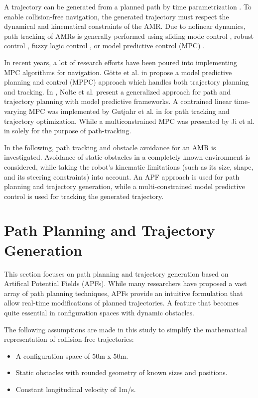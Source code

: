 \documentclass[a4paper, twocolumn]{article}
\begin{document}
A trajectory can be generated from a planned path by time parametrization \cite{roesmann1}. 
To enable collision-free navigation, the generated trajectory must respect the dynamical and kinematical constraints of the AMR.
Due to nolinear dynamics, path tracking of AMRs is generally performed using sliding mode control \cite{yang1}, 
robust control \cite{normey-rico1}, fuzzy logic control \cite{antonelli1}, or model predictive control (MPC) \cite{ji1}.

In recent years, a lot of research efforts have been poured into implementing MPC algorithms for navigation.
Götte et al. in \cite{goette1} propose a model predictive planning and control (MPPC) approach which handles both trajectory planning and tracking.
In \cite{nolte1}, Nolte et al. present a generalized approach for path and trajectory planning with model predictive frameworks.
A contrained linear time-varying MPC was implemented by Gutjahr et al. in \cite{gutjahr1} for path tracking and trajectory optimization.
While a multiconstrained MPC was presented by Ji et al. in \cite{ji1} solely for the purpose of path-tracking.

In the following, path tracking and obstacle avoidance for an AMR is investigated.
Avoidance of static obstacles in a completely known environment is considered, while taking the robot’s kinematic limitations 
(such as its size, shape, and its steering constraints) into account.
An APF approach is used for path planning and trajectory generation, 
while a multi-constrained model predictive control is used for tracking the generated trajectory.


\section{Path Planning and Trajectory Generation}
This section focuses on path planning and trajectory generation based on Artifical Potential Fields (APFs).
While many researchers have proposed a vast array of path planning techniques, APFs provide an intuitive formulation that 
allow real-time modifications of planned trajectories. A feature that becomes quite essential in configuration spaces with dynamic obstacles.

The following assumptions are made in this study to simplify the mathematical representation of collision-free trajectories:
\begin{itemize}
    \item A configuration space of 50m x 50m.
    \item Static obstacles with rounded geometry of known sizes and positions.
    \item Constant longitudinal velocity of 1m/s.
\end{itemize}
\end{document}

